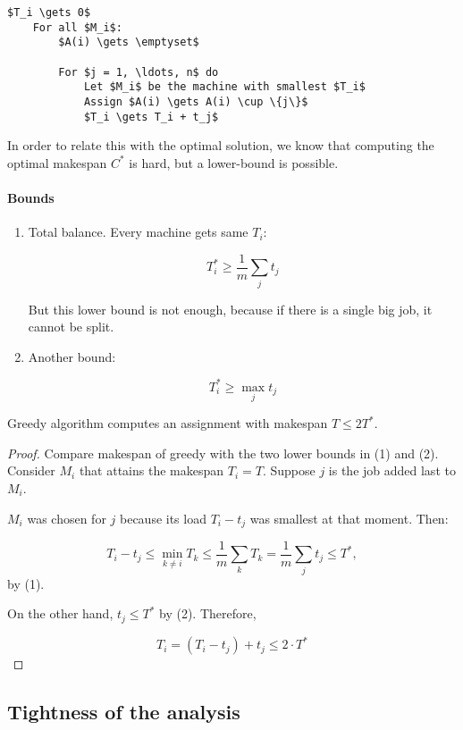 \begin{lstlisting}[mathescape]
    $T_i \gets 0$
    For all $M_i$:
        $A(i) \gets \emptyset$
        
        For $j = 1, \ldots, n$ do
            Let $M_i$ be the machine with smallest $T_i$
            Assign $A(i) \gets A(i) \cup \{j\}$
            $T_i \gets T_i + t_j$
\end{lstlisting}

In order to relate this with the optimal solution, we know that computing the optimal makespan $C^*$ is hard, but a lower-bound is possible.

\paragraph{Bounds}
\begin{enumerate}
\item Total balance. Every machine gets same $T_i$:

$$T_i^* \ge \frac{1}{m} \sum\limits_j t_j$$

But this lower bound is not enough, because if there is a single big job, it cannot be split.

\item Another bound:

$$T_i^* \ge \max \limits_j t_j$$
\end{enumerate}

\begin{mytheorem}
Greedy algorithm computes an assignment with makespan $T \le 2 T^*$.
\end{mytheorem}
\begin{proof}
Compare makespan of greedy with the two lower bounds in (1) and (2).
Consider $M_i$ that attains the makespan $T_i = T$. Suppose $j$ is the job added last to $M_i$.

$M_i$ was chosen for $j$ because its load $T_i - t_j$ was smallest at that moment. Then:

$$T_i - t_j \le \min_{k\neq i} T_k \le \frac{1}{m} \sum \limits_k T_k = \frac{1}{m} \sum_j t_j \le T^*,$$
by (1).

On the other hand, $t_j \le T^*$ by (2). Therefore,

$$T_i = (T_i - t_j) + t_j \le 2 \cdot T^*$$
\end{proof}

\subsection{Tightness of the analysis}

